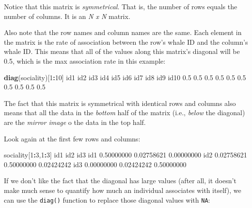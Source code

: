 \documentclass[
]{book}
\newenvironment{Shaded}{\begin{snugshade}}{\end{snugshade}}
\newcommand{\DecValTok}[1]{\textcolor[rgb]{0.00,0.00,0.81}{#1}}
\newcommand{\FloatTok}[1]{\textcolor[rgb]{0.00,0.00,0.81}{#1}}
\newcommand{\KeywordTok}[1]{\textcolor[rgb]{0.13,0.29,0.53}{\textbf{#1}}}
\newcommand{\NormalTok}[1]{#1}
\newcommand{\OperatorTok}[1]{\textcolor[rgb]{0.81,0.36,0.00}{\textbf{#1}}}
\begin{document}
Notice that this matrix is \emph{symmetrical}. That is, the number of rows equals the number of columns. It is an \emph{N x N} matrix.

Also note that the row names and column names are the same. Each element in the matrix is the rate of association between the row's whale ID and the column's whale ID. This means that all of the values along this matrix's diagonal will be 0.5, which is the max association rate in this example:

\begin{Shaded}
\begin{Highlighting}[]
\KeywordTok{diag}\NormalTok{(sociality)[}\DecValTok{1}\OperatorTok{:}\DecValTok{10}\NormalTok{]}
\NormalTok{ id1  id2  id3  id4  id5  id6  id7  id8  id9 id10 }
 \FloatTok{0.5}  \FloatTok{0.5}  \FloatTok{0.5}  \FloatTok{0.5}  \FloatTok{0.5}  \FloatTok{0.5}  \FloatTok{0.5}  \FloatTok{0.5}  \FloatTok{0.5}  \FloatTok{0.5} 
\end{Highlighting}
\end{Shaded}

The fact that this matrix is symmetrical with identical rows and columns also means that all the data in the \emph{bottom} half of the matrix (i.e., \emph{below} the diagonal) are the \emph{mirror image} o the data in the top half.

Look again at the first few rows and columns:

\begin{Shaded}
\begin{Highlighting}[]
\NormalTok{sociality[}\DecValTok{1}\OperatorTok{:}\DecValTok{3}\NormalTok{,}\DecValTok{1}\OperatorTok{:}\DecValTok{3}\NormalTok{]}
\NormalTok{           id1        id2        id3}
\NormalTok{id1 }\FloatTok{0.50000000} \FloatTok{0.02758621} \FloatTok{0.00000000}
\NormalTok{id2 }\FloatTok{0.02758621} \FloatTok{0.50000000} \FloatTok{0.02424242}
\NormalTok{id3 }\FloatTok{0.00000000} \FloatTok{0.02424242} \FloatTok{0.50000000}
\end{Highlighting}
\end{Shaded}

If we don't like the fact that the diagonal has large values (after all, it doesn't make much sense to quantify how much an individual associates with itself), we can use the \texttt{diag()} function to replace those diagonal values with \texttt{NA}:
\end{document}
